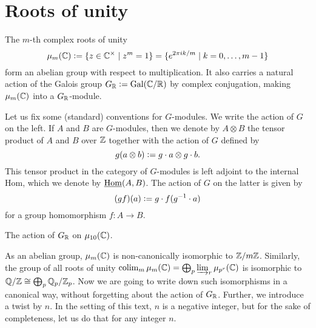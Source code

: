 
\section{Roots of unity}
\label{section:roots-of-unity}

The $m$-th complex roots of unity
\[ \mu_m (\mathbb{C}) \mathrel{\mathop:}= \{ z \in \mathbb{C}^\times \mid z^m = 1 \} =
  \{ e^{2\pi i k/m} \mid k = 0,\ldots,m-1 \} \]
form an abelian group with respect to multiplication. It also carries a natural
action of the Galois group $G_{\mathbb{R}} \mathrel{\mathop:}= \operatorname{Gal} (\mathbb{C}/\mathbb{R})$ by complex conjugation,
making $\mu_m (\mathbb{C})$ into a $G_{\mathbb{R}}$-module.

Let us fix some (standard) conventions for $G$-modules. We write the action of
$G$ on the left. If $A$ and $B$ are $G$-modules, then we denote by $A\otimes B$
the tensor product of $A$ and $B$ over $\mathbb{Z}$ together with the action of $G$
defined by
$$g (a\otimes b) \mathrel{\mathop:}= g\cdot a \otimes g\cdot b.$$
This tensor product in the category of $G$-modules is left adjoint to the
internal Hom, which we denote by $\underline{\operatorname{Hom}} (A,B)$. The action of $G$ on the latter
is given by
$$(g f) (a) \mathrel{\mathop:}= g\cdot f (g^{-1}\cdot a)$$
for a group homomorphism $f\colon A\to B$.

\begin{center}

  The action of $G_{\mathbb{R}}$ on $\mu_{10} (\mathbb{C})$.
\end{center}

As an abelian group, $\mu_m (\mathbb{C})$ is non-canonically isomorphic to
$\mathbb{Z}/m\mathbb{Z}$. Similarly, the group of all roots of unity
$\operatorname*{co{\lim}}_m \mu_m (\mathbb{C}) = \bigoplus_p \varinjlim_r \mu_{p^r} (\mathbb{C})$ is isomorphic to
$\mathbb{Q}/\mathbb{Z} \cong \bigoplus_p \mathbb{Q}_p/\mathbb{Z}_p$. Now we are going to write down such
isomorphisms in a canonical way, without forgetting about the action of
$G_{\mathbb{R}}$. Further, we introduce a twist by $n$. In the setting of this text, $n$
is a negative integer, but for the sake of completeness, let us do that for any
integer $n$.

